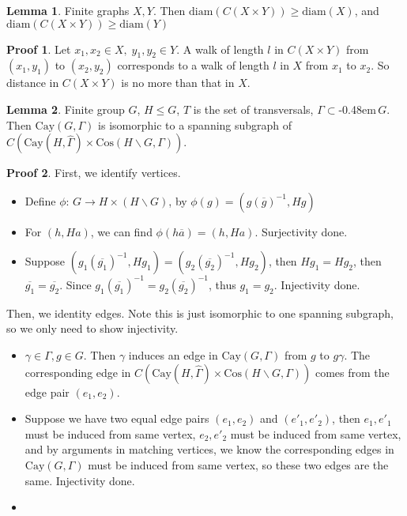 \documentclass{book}
\newcommand{\syin}{$\subset$\kern-0.48em\raisebox{.20ex}{\tiny S}$\,$}
\newcommand{\diam}[1]{\textrm{diam}( #1 )}
\newcommand{\Cay}[1]{\textrm{Cay}( #1 )}
\newcommand{\Cos}[1]{\textrm{Cos}( #1 )}
\theoremstyle{definition}
\newtheorem{lemma}{Lemma}[chapter]
\theoremstyle{remarkstyle}
\newtheorem*{myproof}{Proof}%
\begin{document}
\begin{lemma}
    Finite graphs $X,Y$. Then $\diam{C(X\times Y)} \ge \diam{X}$, and $\diam{C(X\times Y)} \ge \diam{Y}$
\end{lemma}
\begin{myproof}
    Let $x_{1}, x_{2} \in X, \; y_{1}, y_{2} \in Y $. A walk of length $l$ in $C(X \times Y)$ from $(x_{1}, y_{1}) $ to $(x_{2}, y_{2}) $ corresponds to a walk of length $l$ in $X$ from $x_{1} $ to $x_{2} $. So distance in $C(X \times Y)$ is no more than that in $X$. \newline 
\end{myproof}


\begin{lemma}
    Finite group $G$, $H \le G$, $T$ is the set of transversals, $\Gamma$\syin$G$. Then $\Cay{G,\Gamma}$ is isomorphic to a spanning subgraph of $C(\Cay{H,\hat{\Gamma}} \times \Cos{H\backslash G, \Gamma })$.
\end{lemma}
\begin{myproof}
    First, we identify vertices. 
    \begin{itemize}
        \item Define $\phi : \, G \rightarrow H \times (H\backslash G) $, by $\phi(g) = (g(\overline{g})^{-1}, Hg) $
        \item For $(h, Ha)$, we can find $\phi(h\overline{a}) = (h, Ha)$. Surjectivity done.
        \item Suppose $ (g_{1}(\overline{g_{1}})^{-1}, Hg_{1}) = (g_{2}(\overline{g_{2}})^{-1}, Hg_{2})  $, then $Hg_{1} = Hg_{2} $, then $\overline{g_{1}} = \overline{g_{2}}$. Since $g_{1}(\overline{g_{1}})^{-1} = g_{2}(\overline{g_{2}})^{-1}$, thus $g_{1} = g_{2} $. Injectivity done.
    \end{itemize}
    Then, we identity edges. Note this is just isomorphic to one spanning subgraph, so we only need to show injectivity.
    \begin{itemize}
        \item $\gamma \in \Gamma, g\in G$. Then $\gamma$ induces an edge in $\Cay{G,\Gamma}$ from $g$ to $g\gamma$. The corresponding edge in $C(\Cay{H,\hat{\Gamma}} \times \Cos{H\backslash G, \Gamma })$ comes from the edge pair $(e_{1}, e_{2})$. 
        \item Suppose we have two equal edge pairs $(e_{1}, e_{2})$ and $(e'_{1}, e'_{2})$, then $e_{1}, e'_{1} $ must be induced from same vertex, $e_{2}, e'_{2} $ must be induced from same vertex, and by arguments in matching vertices, we know the corresponding edges in $\Cay{G,\Gamma}$ must be induced from same vertex, so these two edges are the same. Injectivity done.
        \item[] 
    \end{itemize}
\end{myproof}
\end{document}
